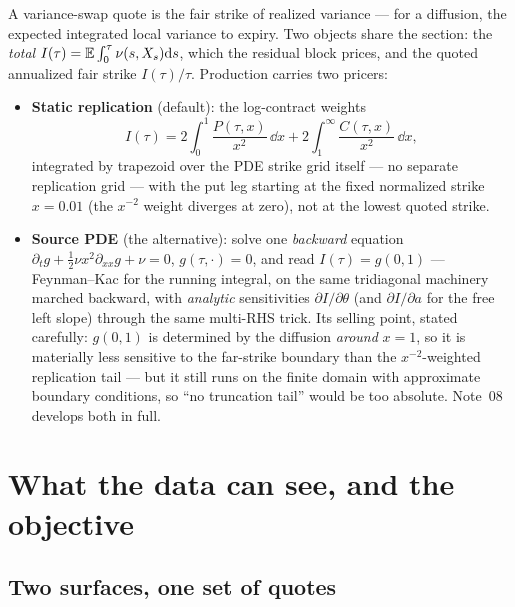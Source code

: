 \documentclass[11pt]{article}
\begin{document}
A variance-swap quote is the fair strike of realized variance --- for a
diffusion, the expected integrated local variance to expiry.  Two objects
share the section: the \emph{total} $I(\tau)=\mathbb{E}\int_0^\tau\nu(s,X_s)\mathrm{d} s$,
which the residual block prices, and the quoted annualized fair strike
$I(\tau)/\tau$.  Production carries two pricers:
\begin{itemize}[leftmargin=1.4em]
\item \textbf{Static replication} (default): the log-contract weights
\begin{equation}
I(\tau)=2\int_0^{1}\frac{P(\tau,x)}{x^{2}}\,\dd x
+2\int_1^{\infty}\frac{C(\tau,x)}{x^{2}}\,\dd x,
\label{eq:logcontract}
\end{equation}
integrated by trapezoid over the PDE strike grid itself --- no separate
replication grid --- with the put leg starting at the fixed normalized
strike $x=0.01$ (the $x^{-2}$ weight diverges at zero), not at the lowest
quoted strike.
\item \textbf{Source PDE} (the alternative): solve one \emph{backward}
equation
$\partial_t g+\tfrac12\nu x^{2}\partial_{xx}g+\nu=0$, $g(\tau,\cdot)=0$,
and read $I(\tau)=g(0,1)$ --- Feynman--Kac for the running integral, on the
same tridiagonal machinery marched backward, with \emph{analytic}
sensitivities $\partial I/\partial\theta$ (and $\partial I/\partial a$ for
the free left slope) through the same multi-RHS trick.  Its selling point,
stated carefully: $g(0,1)$ is determined by the diffusion \emph{around}
$x=1$, so it is materially less sensitive to the far-strike boundary than
the $x^{-2}$-weighted replication tail --- but it still runs on the finite
domain with approximate boundary conditions, so ``no truncation tail''
would be too absolute.  Note~08 develops both in full.
\end{itemize}

\section{What the data can see, and the objective}
\label{sec:objective}

\subsection{Two surfaces, one set of quotes}
\label{sec:identify}
\end{document}

